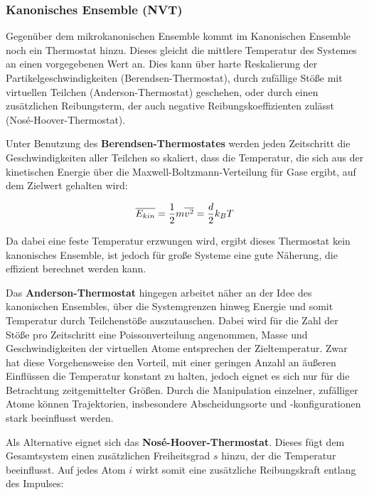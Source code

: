 \subsubsection{Kanonisches Ensemble (NVT)}

Gegenüber dem mikrokanonischen Ensemble kommt im Kanonischen Ensemble noch ein Thermostat hinzu.
Dieses gleicht die mittlere Temperatur des Systemes an einen vorgegebenen Wert an.
Dies kann über harte Reskalierung der Partikelgeschwindigkeiten (Berendsen-Thermostat), durch zufällige Stöße mit virtuellen Teilchen (Anderson-Thermostat) geschehen, oder durch einen zusätzlichen Reibungsterm, der auch negative Reibungskoeffizienten zulässt (Nosé-\-Hoover-\-Thermostat).

Unter Benutzung des \textbf{Berendsen-Thermostates} werden jeden Zeitschritt die Geschwindigkeiten aller Teilchen so skaliert, dass die Temperatur, die sich aus der kinetischen Energie über die Maxwell-Boltzmann-Verteilung für Gase ergibt, auf dem Zielwert gehalten wird:

\begin{equation}
  \overline{E_{kin}} = {1\over2} m\overline{v^2} = {d\over2}k_BT
\end{equation}


Da dabei eine feste Temperatur erzwungen wird, ergibt dieses Thermostat kein kanonisches Ensemble, ist jedoch für große Systeme eine gute Näherung, die effizient berechnet werden kann.

Das \textbf{Anderson-Thermostat} hingegen arbeitet näher an der Idee des kanonischen Ensembles, über die Systemgrenzen hinweg Energie und somit Temperatur durch Teilchenstöße auszutauschen.
Dabei wird für die Zahl der Stöße pro Zeitschritt eine Poissonverteilung angenommen, Masse und Geschwindigkeiten der virtuellen Atome entsprechen der Zieltemperatur.
Zwar hat diese Vorgehensweise den Vorteil, mit einer geringen Anzahl an äußeren Einflüssen die Temperatur konstant zu halten, jedoch eignet es sich nur für die Betrachtung zeitgemittelter Größen.
Durch die Manipulation einzelner, zufälliger Atome können Trajektorien, insbesondere Abscheidungsorte und -konfigurationen stark beeinflusst werden.

Als Alternative eignet sich das \textbf{Nosé-Hoover-Thermostat}.
Dieses fügt dem Gesamtsystem einen zusätzlichen Freiheitsgrad $s$ hinzu, der die Temperatur beeinflusst.
Auf jedes Atom $i$ wirkt somit eine zusätzliche Reibungskraft entlang des Impulses:

